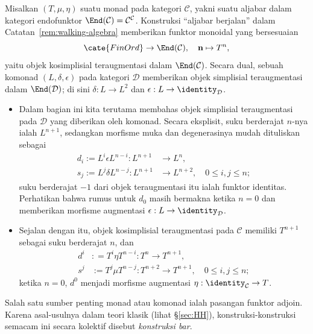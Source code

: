 \begin{example}\label{eg:monad-simplicial}
	Misalkan $(T,\mu,\eta)$ suatu monad pada kategori $\mathcal{C}$, yakni
	suatu aljabar dalam kategori endofunktor
	$\End(\mathcal{C})=\mathcal{C}^{\mathcal{C}}$. Konstruksi ``aljabar
	berjalan'' dalam Catatan~\ref{rem:walking-algebra} memberikan funktor
	monoidal yang bersesuaian
	\[ \cate{FinOrd} \to \End(\mathcal{C}), \quad \mathbf{n} \mapsto T^n , \]
	yaitu objek kosimplisial teraugmentasi dalam $\End(\mathcal{C})$. Secara
	dual, sebuah komonad $(L,\delta,\epsilon)$ pada kategori $\mathcal{D}$
	memberikan objek simplisial teraugmentasi dalam $\End(\mathcal{D})$;
	di sini $\delta:L\to L^2$ dan
	$\epsilon:L\to\identity_{\mathcal{D}}$.

	\begin{itemize}
		\item Dalam bagian ini kita terutama membahas objek simplisial
		teraugmentasi pada $\mathcal{D}$ yang diberikan oleh komonad. Secara
		eksplisit, suku berderajat $n$-nya ialah $L^{n+1}$, sedangkan morfisme
		muka dan degenerasinya mudah dituliskan sebagai
		\begin{align*}
			d_i := L^i \epsilon L^{n-i}: L^{n+1} & \to L^n, \\
			s_j := L^j \delta L^{n-j}: L^{n+1} & \to L^{n+2}, \quad 0 \leq i, j \leq n ;
		\end{align*}
		suku berderajat $-1$ dari objek teraugmentasi itu ialah funktor
		identitas. Perhatikan bahwa rumus untuk $d_0$ masih bermakna ketika
		$n=0$ dan memberikan morfisme augmentasi
		$\epsilon:L\to\identity_{\mathcal{D}}$.

		\item Sejalan dengan itu, objek kosimplisial teraugmentasi pada
		$\mathcal{C}$ memiliki $T^{n+1}$ sebagai suku berderajat $n$, dan
		\begin{align*}
			d^i & : = T^i \eta T^{n-i}: T^n \to T^{n+1}, \\
			s^j & := T^j \mu T^{n-j}: T^{n+2} \to T^{n+1}, \quad 0 \leq i, j \leq n ;
		\end{align*}
		ketika $n=0$, $d^0$ menjadi morfisme augmentasi
		$\eta:\identity_{\mathcal{C}}\to T$.
	\end{itemize}
\end{example}

Salah satu sumber penting monad atau komonad ialah pasangan funktor
adjoin. Karena asal-usulnya dalam teori klasik (lihat
\S\ref{sec:HH}), konstruksi-konstruksi semacam ini secara kolektif disebut
\emph{konstruksi bar}.

